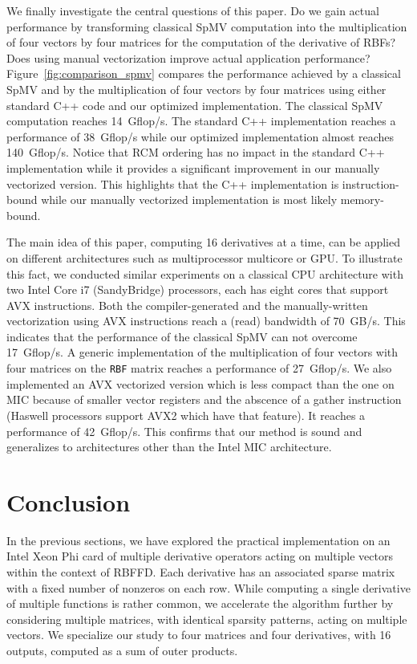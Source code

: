 \documentclass{sig-alternate}
\def\ee#1{{#1}}
\begin{document}
We finally investigate the central questions of this paper. Do we gain
actual performance by transforming classical SpMV computation into the
multiplication of four vectors by four matrices for the computation of the
derivative of RBFs? Does using manual vectorization improve actual
application performance? Figure~\ref{fig:comparison_spmv} compares the
performance achieved by a classical SpMV and by the multiplication of
four vectors by four matrices using either standard C++ code and our
optimized implementation. The
classical SpMV computation reaches 14~Gflop/s. 
The standard C++ implementation reaches a performance of 38~Gflop/s while our
optimized implementation almost reaches 140~Gflop/s. 
Notice that 
RCM ordering has no impact in the standard C++ implementation while it
provides a significant improvement in our manually vectorized
version. This highlights that the C++ implementation is instruction-bound
while our manually vectorized implementation is most likely 
memory-bound. 

\ee{The main idea of this paper, computing 16 derivatives at a time,
  can be applied on different architectures such as multiprocessor
  multicore or GPU. To illustrate this fact, we conducted similar
  experiments on a classical CPU architecture with two Intel Core i7
  (SandyBridge) processors, each has eight cores that support AVX
  instructions.}  Both the compiler-generated and the manually-written
vectorization using AVX instructions reach a (read) bandwidth of
70~GB/s. This indicates that the performance of the classical SpMV can
not overcome 17~Gflop/s. A generic implementation of the
multiplication of four vectors with four matrices on the {\tt RBF}
matrix reaches a performance of 27~Gflop/s. \ee{We also implemented an AVX
vectorized version which is less compact than the one on MIC because
of smaller vector registers and the abscence of a gather instruction
(Haswell processors support AVX2 which have that feature).} It reaches a
performance of 42~Gflop/s. This confirms that our method is sound and
generalizes to architectures other than the Intel MIC architecture.

\vspace{-0.5em}
\section{Conclusion}
\label{sec:ccl}

In the previous sections, we have explored the practical
implementation on an Intel Xeon Phi card of multiple derivative
operators acting on multiple vectors within the context of
RBFFD. Each derivative has an associated sparse matrix with a fixed
number of nonzeros on each row. While computing a single derivative of
multiple functions is rather common, we accelerate the algorithm further 
by considering multiple
matrices, with identical sparsity patterns, acting on multiple vectors. 
We specialize our study to four matrices and four derivatives,
with 16 outputs, computed as a sum of outer products.
\end{document}
